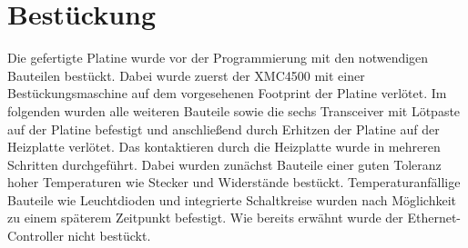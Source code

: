 \section{Bestückung}
Die gefertigte Platine wurde vor der Programmierung mit den notwendigen Bauteilen bestückt. Dabei wurde zuerst der XMC4500 mit einer Bestückungsmaschine auf dem vorgesehenen Footprint der Platine verlötet. Im folgenden wurden alle weiteren Bauteile sowie die sechs Transceiver mit Lötpaste auf der Platine befestigt und anschließend durch Erhitzen der Platine auf der Heizplatte verlötet. Das kontaktieren durch die Heizplatte wurde in mehreren Schritten durchgeführt. Dabei wurden zunächst Bauteile einer guten Toleranz hoher Temperaturen wie Stecker und Widerstände bestückt. Temperaturanfällige Bauteile wie Leuchtdioden und integrierte Schaltkreise wurden nach Möglichkeit zu einem späterem Zeitpunkt befestigt. Wie bereits erwähnt wurde der Ethernet-Controller nicht bestückt.

